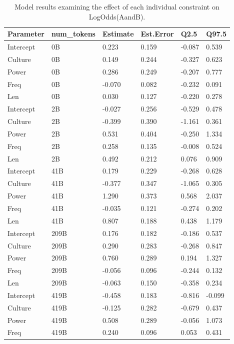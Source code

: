 \documentclass[
  12pt,
  letterpaper,
]{scrreprt}
\begin{document}
\begin{longtable}[]{@{}llllll@{}}

\caption{\label{tbl-exp2m2}Model results examining the effect of each
individual constraint on LogOdds(AandB).}

\tabularnewline

\toprule\noalign{}
Parameter & num\_tokens & Estimate & Est.Error & Q2.5 & Q97.5 \\
\midrule\noalign{}
\endhead
\bottomrule\noalign{}
\endlastfoot
Intercept & 0B & 0.223 & 0.159 & -0.087 & 0.539 \\
Culture & 0B & 0.149 & 0.244 & -0.327 & 0.623 \\
Power & 0B & 0.286 & 0.249 & -0.207 & 0.777 \\
Freq & 0B & -0.070 & 0.082 & -0.232 & 0.091 \\
Len & 0B & 0.030 & 0.127 & -0.220 & 0.278 \\
Intercept & 2B & -0.027 & 0.256 & -0.529 & 0.478 \\
Culture & 2B & -0.399 & 0.390 & -1.161 & 0.361 \\
Power & 2B & 0.531 & 0.404 & -0.250 & 1.334 \\
Freq & 2B & 0.258 & 0.135 & -0.008 & 0.524 \\
Len & 2B & 0.492 & 0.212 & 0.076 & 0.909 \\
Intercept & 41B & 0.179 & 0.229 & -0.268 & 0.628 \\
Culture & 41B & -0.377 & 0.347 & -1.065 & 0.305 \\
Power & 41B & 1.290 & 0.373 & 0.568 & 2.037 \\
Freq & 41B & -0.035 & 0.121 & -0.274 & 0.202 \\
Len & 41B & 0.807 & 0.188 & 0.438 & 1.179 \\
Intercept & 209B & 0.176 & 0.182 & -0.186 & 0.537 \\
Culture & 209B & 0.290 & 0.283 & -0.268 & 0.847 \\
Power & 209B & 0.760 & 0.289 & 0.194 & 1.327 \\
Freq & 209B & -0.056 & 0.096 & -0.244 & 0.132 \\
Len & 209B & -0.063 & 0.150 & -0.358 & 0.234 \\
Intercept & 419B & -0.458 & 0.183 & -0.816 & -0.099 \\
Culture & 419B & -0.125 & 0.282 & -0.679 & 0.437 \\
Power & 419B & 0.508 & 0.289 & -0.056 & 1.073 \\
Freq & 419B & 0.240 & 0.096 & 0.053 & 0.431 \\

\end{longtable}
\end{document}
